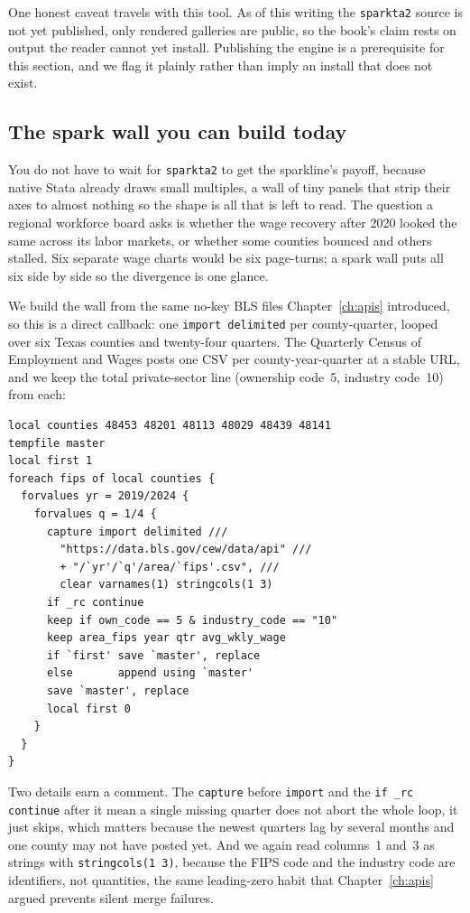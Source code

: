 \documentclass[
    a4paper,
    fontsize=10pt,
    twoside=true,
    numbers=noenddot,
]{kaobook}
\begin{document}
One honest caveat travels with this tool. As of this writing the \texttt{sparkta2} source is not yet published, only rendered galleries are public, so the book's claim rests on output the reader cannot yet install. Publishing the engine is a prerequisite for this section, and we flag it plainly rather than imply an install that does not exist.

\subsection{The spark wall you can build today}\label{sec:sparkwall}
You do not have to wait for \texttt{sparkta2} to get the sparkline's payoff, because native Stata already draws small multiples, a wall of tiny panels that strip their axes to almost nothing so the shape is all that is left to read. The question a regional workforce board asks is whether the wage recovery after 2020 looked the same across its labor markets, or whether some counties bounced and others stalled. Six separate wage charts would be six page-turns; a spark wall puts all six side by side so the divergence is one glance.

We build the wall from the same no-key BLS files Chapter~\ref{ch:apis} introduced, so this is a direct callback: one \texttt{import delimited} per county-quarter, looped over six Texas counties and twenty-four quarters. The Quarterly Census of Employment and Wages posts one CSV per county-year-quarter at a stable URL, and we keep the total private-sector line (ownership code~5, industry code~10) from each:
{\footnotesize
\begin{verbatim}
local counties 48453 48201 48113 48029 48439 48141
tempfile master
local first 1
foreach fips of local counties {
  forvalues yr = 2019/2024 {
    forvalues q = 1/4 {
      capture import delimited ///
        "https://data.bls.gov/cew/data/api" ///
        + "/`yr'/`q'/area/`fips'.csv", ///
        clear varnames(1) stringcols(1 3)
      if _rc continue
      keep if own_code == 5 & industry_code == "10"
      keep area_fips year qtr avg_wkly_wage
      if `first' save `master', replace
      else       append using `master'
      save `master', replace
      local first 0
    }
  }
}
\end{verbatim}
}
Two details earn a comment. The \texttt{capture} before \texttt{import} and the \texttt{if \_rc continue} after it mean a single missing quarter does not abort the whole loop, it just skips, which matters because the newest quarters lag by several months and one county may not have posted yet. And we again read columns~1 and~3 as strings with \texttt{stringcols(1 3)}, because the FIPS code and the industry code are identifiers, not quantities, the same leading-zero habit that Chapter~\ref{ch:apis} argued prevents silent merge failures.
\end{document}

